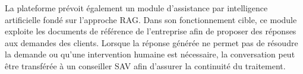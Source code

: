 \documentclass[12pt, a4paper]{report}
\begin{document}
La plateforme prévoit également un module d'assistance par intelligence artificielle fondé sur l'approche RAG. Dans son fonctionnement cible, ce module exploite les documents de référence de l'entreprise afin de proposer des réponses aux demandes des clients. Lorsque la réponse générée ne permet pas de résoudre la demande ou qu'une intervention humaine est nécessaire, la conversation peut être transférée à un conseiller SAV afin d'assurer la continuité du traitement.
\end{document}

